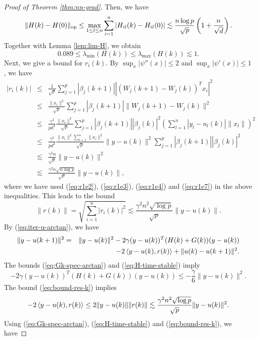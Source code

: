 \begin{proof}[Proof of Theorem \ref{thm:nn-grad}]
Then, we have
$$
\|H(k)-H(0)\|_{\rm op}\leq \max_{1\leq l\leq n}\sum_{i=1}^n|H_{il}(k) - H_{il}(0)|\lesssim \frac{n\log p}{\sqrt{p}}\left(1+\frac{n}{\sqrt{d}}\right).
$$
Together with Lemma \ref{lem:lim-H}, we obtain
\begin{equation}
0.089 \leq \lambda_{\min}(H(k)) \leq \lambda_{\max}(H(k)) \lesssim 1. \label{eq:H-time-stable}
\end{equation}
Next, we give a bound for $r_i(k)$. By $\sup_x|\psi''(x)|\leq 2$ and $\sup_x|\psi'(x)|\leq 1$, we have
\begin{eqnarray*}
|r_i(k)| &\leq& \frac{1}{\sqrt{p}}\sum_{j=1}^p|\beta_j(k+1)||(W_j(k+1)-W_j(k))^Tx_i|^2 \\
&\leq& \frac{\|x_i\|^2}{\sqrt{p}}\sum_{j=1}^p|\beta_j(k+1)|\|W_j(k+1)-W_j(k)\|^2 \\
&\leq& \frac{\gamma^2}{pd^2}\frac{\|x_i\|^2}{\sqrt{p}}\sum_{j=1}^p|\beta_j(k+1)||\beta_j(k)|^2\left(\sum_{l=1}^n|y_l-u_l(k)|\|x_l\|\right)^2 \\
&\leq& \frac{\gamma^2}{pd^2}\frac{\|x_i\|^2\sum_{l=1}^n\|x_l\|^2}{\sqrt{p}}\|y-u(k)\|^2\sum_{j=1}^p|\beta_j(k+1)||\beta_j(k)|^2 \\
&\lesssim& \frac{\gamma^2n}{\sqrt{p}}\|y-u(k)\|^2 \\
&\lesssim& \frac{\gamma^2n\sqrt{n\log p}}{\sqrt{p}}\|y-u(k)\|,
\end{eqnarray*}
where we have used (\ref{eq:r1e2}), (\ref{eq:r1e3}), (\ref{eq:r1e4}) and (\ref{eq:r1e7}) in the above inequalities.
This leads to the bound
\begin{equation}
\|r(k)\|=\sqrt{\sum_{i=1}^n|r_i(k)|^2}\lesssim \frac{\gamma^2n^2\sqrt{\log p}}{\sqrt{p}}\|y-u(k)\|.\label{eq:bound-res-k}
\end{equation}
By (\ref{eq:iter-u-arctan}), we have
\begin{eqnarray*}
\|y-u(k+1)\|^2 
&=& \|y-u(k)\|^2 - 2\gamma(y-u(k))^T(H(k)+G(k))(y-u(k)) \\
&& - 2\iprod{y-u(k)}{r(k)} + \|u(k)-u(k+1)\|^2.
\end{eqnarray*}
The bounds (\ref{eq:Gk-spec-arctan}) and (\ref{eq:H-time-stable}) imply
\begin{equation}
- 2\gamma(y-u(k))^T(H(k)+G(k))(y-u(k)) \leq -\frac{\gamma}{6}\|y-u(k)\|^2. \label{eq:main-inner}
\end{equation}
The bound (\ref{eq:bound-res-k}) implies
$$- 2\left \langle y-u(k), r(k) \right\rangle\leq 2\|y-u(k)\|\|r(k)\|\lesssim \frac{\gamma^2n^2\sqrt{\log p}}{\sqrt{p}}\|y-u(k)\|^2.$$
Using (\ref{eq:Gk-spec-arctan}), (\ref{eq:H-time-stable}) and (\ref{eq:bound-res-k}), we have

\end{proof}
